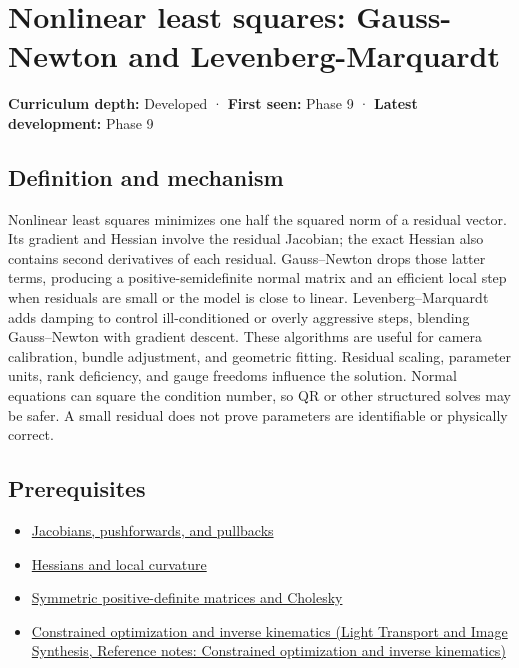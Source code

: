 \hypertarget{appendix-2c2df8345991}{}\label{referencestart:appendix-2c2df8345991}
\section{Nonlinear least squares: Gauss-Newton and Levenberg-Marquardt}\label{appendix-2c2df8345991-nonlinear-least-squares-gauss-newton-and-levenberg-marquardt}

\textbf{Curriculum depth:} Developed · \textbf{First seen:} Phase 9 · \textbf{Latest development:} Phase 9

\subsection{Definition and mechanism}\label{appendix-2c2df8345991-definition-and-mechanism}

Nonlinear least squares minimizes one half the squared norm of a residual vector. Its gradient and Hessian involve the residual Jacobian; the exact Hessian also contains second derivatives of each residual. Gauss--Newton drops those latter terms, producing a positive-semidefinite normal matrix and an efficient local step when residuals are small or the model is close to linear. Levenberg--Marquardt adds damping to control ill-conditioned or overly aggressive steps, blending Gauss--Newton with gradient descent. These algorithms are useful for camera calibration, bundle adjustment, and geometric fitting. Residual scaling, parameter units, rank deficiency, and gauge freedoms influence the solution. Normal equations can square the condition number, so QR or other structured solves may be safer. A small residual does not prove parameters are identifiable or physically correct.

\subsection{Prerequisites}\label{appendix-2c2df8345991-prerequisites}

\begin{itemize}
\tightlist
\item
  \hyperref[appendix-d8a7ddb675eb]{Jacobians, pushforwards, and pullbacks}
\item
  \hyperref[appendix-6ac071f8b50c]{Hessians and local curvature}
\item
  \hyperref[appendix-50d2ea3c9b26]{Symmetric positive-definite matrices and Cholesky}
\item
  \href{../04-Light-Transport-and-Image-Synthesis/main.pdf\#nameddest=appendix-29f4bea4c2bb}{Constrained optimization and inverse kinematics (Light Transport and Image Synthesis, Reference notes: Constrained optimization and inverse kinematics)}
\end{itemize}

